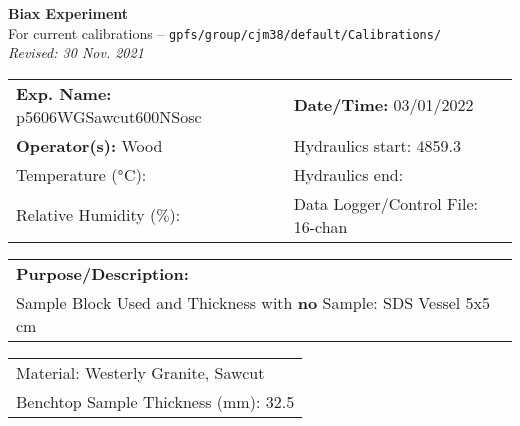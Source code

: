 \documentclass[letterpaper, 10pt]{article}
\begin{document}
\begin{center}
    {\Large \textbf{Biax Experiment}}\\
    {\small For current calibrations -- \texttt{gpfs/group/cjm38/default/Calibrations/}}\\
    {\footnotesize \textit{Revised: 30 Nov. 2021}}
\end{center}



\begin{table}[!ht]
	\renewcommand{\arraystretch}{1.1}
	\begin{tabular}{p{10cm} p{10cm} }
	    \textbf{Exp. Name: }p5606WGSawcut600NSosc & \textbf{Date/Time: }03/01/2022\\
	    \textbf{Operator(s): }Wood & Hydraulics start: 4859.3 \\
	    Temperature ($\degree$C):  & Hydraulics end:  \\
	    Relative Humidity ($\%$):  & Data Logger/Control File: 16-chan \\
	\end{tabular}
\end{table} 
\vspace{-0.5cm} 

\begin{table}[!ht]
	\renewcommand{\arraystretch}{1.1}
	\begin{tabular}{p{20cm}}\textbf{Purpose/Description:}  \\Sample Block Used and Thickness with \textbf{no} Sample: SDS Vessel 5x5 cm \\
	\end{tabular}
    \end{table} \vspace{-0.5cm} 

\begin{table}[!ht]
        \small
        \renewcommand{\arraystretch}{1.2}
        \begin{tabular}{ |p{7cm}| } \hline 
Material: Westerly Granite, Sawcut \\Benchtop Sample Thickness (mm): 32.5 \\ \hline \end{tabular} \end{table} \vspace{-0.5cm} 
\end{document}
